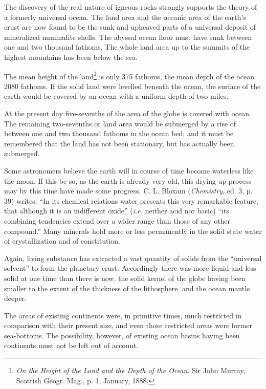 \documentclass[a4paper, 12pt, oneside]{article}
\begin{document}
The discovery of the real nature of igneous rocks strongly supports the theory of a formerly universal ocean. The land area and the oceanic area of the earth's crust are now found to be the sunk and upheaved parts of a universal deposit of mineralized nummulite shells. The abyssal ocean floor must have sunk between one and two thousand fathoms. The whole land area up to the summits of the highest mountains has been below the sea.

The mean height of the land\footnote{\emph{On the Height of the Land and the Depth of the Ocean}. Sir John Murray, Scottish Geogr. Mag., p. 1, January, 1888.} is only 375 fathoms, the mean depth of the ocean 2080 fathoms. If the solid land were levelled beneath the ocean, the surface of the earth would be covered by an ocean with a uniform depth of two miles.

At the present day five-sevenths of the area of the globe is covered with ocean. The remaining two-sevenths or land area would be submerged by a rise of between one and two thousand fathoms in the ocean bed; and it must be remembered that the land has not been stationary, but has actually been submerged.

Some astronomers believe the earth will in course of time become waterless like the moon. If this be so, as the earth is already very old, this drying up process may by this time have made some progress. C. L. Bloxam (\emph{Chemistry}, ed. 3, p. 39) writes: ``In its chemical relations water presents this very remarkable feature, that although it is an indifferent oxide'' (\emph{i.e.} neither acid nor basic) ``its combining tendencies extend over a wider range than those of any other compound.'' Many minerals hold more or less permanently in the solid state water of crystallization and of constitution.

Again, living substance has extracted a vast quantity of solids from the ``universal solvent'' to form the planetary crust. Accordingly there was more liquid and less solid at one time than there is now, the solid kernel of the globe having been smaller to the extent of the thickness of the lithosphere, and the ocean mantle deeper.

The areas of existing continents were, in primitive times, much restricted in comparison with their present size, and even those restricted areas were former sea-bottoms. The possibility, however, of existing ocean basins having been continents must not be left out of account.
\end{document}
